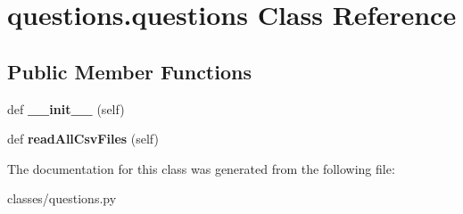 \hypertarget{classquestions_1_1questions}{}\section{questions.\+questions Class Reference}
\label{classquestions_1_1questions}
\subsection*{Public Member Functions}
\begin{DoxyCompactItemize}
\item 
\mbox{\label{classquestions_1_1questions_aabcabf708dce7cfcdf04020e2617f725}} 
def {\bfseries \+\_\+\+\_\+init\+\_\+\+\_\+} (self)
\item 
\mbox{\label{classquestions_1_1questions_a8814d385d95b740c575bb3b6c6ef7da6}} 
def {\bfseries read\+All\+Csv\+Files} (self)
\end{DoxyCompactItemize}


The documentation for this class was generated from the following file\+:\begin{DoxyCompactItemize}
\item 
classes/questions.\+py\end{DoxyCompactItemize}
